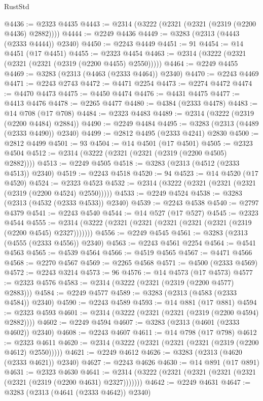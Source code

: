 \begin{lexlean}{RustStd}
\begin{coremodule}
{\begin{coremodule}
{{{{{{{{{{{{{{{{{{{{{{{{{{{{{{{{{{@4436 := @2323 @4435
@4443 := @2314 (@3222 (@2321 (@2321 (@2319 (@2200 @4436) @2882))))
@4444 := @2249 @4436
@4449 := @3283 (@2313 (@4443 (@2333 @4444)) @2340)
@4450 := @2243 @4449
@4451 := 91
@4454 := @14 @4451 (@17 @4451)
@4455 := @2323 @4454
@4463 := @2314 (@3222 (@2321 (@2321 (@2321 (@2319 (@2200 @4455) @2550)))))
@4464 := @2249 @4455
@4469 := @3283 (@2313 (@4463 (@2333 @4464)) @2340)
@4470 := @2243 @4469
@4471 := @2243 @2743
@4472 := @4471 @2254
@4473 := @2274 @4472
@4474 := @4470 @4473
@4475 := @4450 @4474
@4476 := @4431 @4475
@4477 := @4413 @4476
@4478 := @2265 @4477
@4480 := @4384 (@2333 @4478)
@4483 := @14 @708 (@17 @708)
@4484 := @2323 @4483
@4489 := @2314 (@3222 (@2319 (@2200 @4484) @2884))
@4490 := @2249 @4484
@4495 := @3283 (@2313 (@4489 (@2333 @4490)) @2340)
@4499 := @2812 @4495 (@2333 @4241) @2830
@4500 := @2812 @4499
@4501 := 93
@4504 := @14 @4501 (@17 @4501)
@4505 := @2323 @4504
@4512 := @2314 (@3222 (@2321 (@2321 (@2319 (@2200 @4505) @2882))))
@4513 := @2249 @4505
@4518 := @3283 (@2313 (@4512 (@2333 @4513)) @2340)
@4519 := @2243 @4518
@4520 := 94
@4523 := @14 @4520 (@17 @4520)
@4524 := @2323 @4523
@4532 := @2314 (@3222 (@2321 (@2321 (@2321 (@2319 (@2200 @4524) @2550)))))
@4533 := @2249 @4524
@4538 := @3283 (@2313 (@4532 (@2333 @4533)) @2340)
@4539 := @2243 @4538
@4540 := @2797 @4379
@4541 := @2243 @4540
@4544 := @14 @527 (@17 @527)
@4545 := @2323 @4544
@4555 := @2314 (@3222 (@2321 (@2321 (@2321 (@2321 (@2321 (@2319 (@2200 @4545) @2327)))))))
@4556 := @2249 @4545
@4561 := @3283 (@2313 (@4555 (@2333 @4556)) @2340)
@4563 := @2243 @4561 @2254
@4564 := @4541 @4563
@4565 := @4539 @4564
@4566 := @4519 @4565
@4567 := @4471 @4566
@4568 := @2270 @4567
@4569 := @2265 @4568
@4571 := @4500 (@2333 @4569)
@4572 := @2243 @3214
@4573 := 96
@4576 := @14 @4573 (@17 @4573)
@4577 := @2323 @4576
@4583 := @2314 (@3222 (@2321 (@2319 (@2200 @4577) @2883)))
@4584 := @2249 @4577
@4589 := @3283 (@2313 (@4583 (@2333 @4584)) @2340)
@4590 := @2243 @4589
@4593 := @14 @881 (@17 @881)
@4594 := @2323 @4593
@4601 := @2314 (@3222 (@2321 (@2321 (@2319 (@2200 @4594) @2882))))
@4602 := @2249 @4594
@4607 := @3283 (@2313 (@4601 (@2333 @4602)) @2340)
@4608 := @2243 @4607
@4611 := @14 @798 (@17 @798)
@4612 := @2323 @4611
@4620 := @2314 (@3222 (@2321 (@2321 (@2321 (@2319 (@2200 @4612) @2550)))))
@4621 := @2249 @4612
@4626 := @3283 (@2313 (@4620 (@2333 @4621)) @2340)
@4627 := @2243 @4626
@4630 := @14 @891 (@17 @891)
@4631 := @2323 @4630
@4641 := @2314 (@3222 (@2321 (@2321 (@2321 (@2321 (@2321 (@2319 (@2200 @4631) @2327)))))))
@4642 := @2249 @4631
@4647 := @3283 (@2313 (@4641 (@2333 @4642)) @2340)
}}}}}}}}}}}}}}}}}}}}}}}}}}}}}}}}}}
\end{coremodule}}
\end{coremodule}
\end{lexlean}
